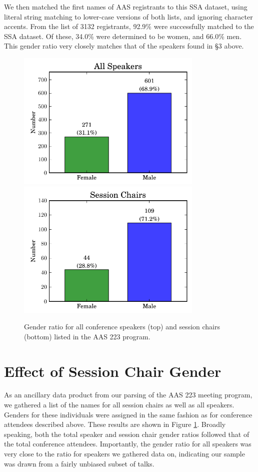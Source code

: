 \documentclass[iop]{emulateapj}
\begin{document}
We then matched the first names of AAS registrants to this SSA dataset, using literal string matching to lower-case versions of both lists, and ignoring character accents. From the list of 3132 registrants, 92.9\% were successfully matched to the SSA dataset. Of these,  34.0\% were determined to be women, and 66.0\% men. This gender ratio very closely matches that of the speakers found in \S3 above.



\begin{figure}[!t]
\centering
\includegraphics[width=3.5in]{speakers}
\includegraphics[width=3.5in]{chairs}
\caption{Gender ratio for all conference speakers (top) and session chairs (bottom) listed in the AAS 223 program.}
\label{fig:speakerchair}
\end{figure}

\section{Effect of Session Chair Gender}

As an ancillary data product from our parsing of the AAS 223 meeting program, we gathered a list of the names for all session chairs as well as all speakers. Genders for these individuals were assigned in the same fashion as for conference attendees described above. These results are shown in Figure \ref{fig:speakerchair}. Broadly speaking, both the total speaker and session chair gender ratios followed that of the total conference attendees. Importantly, the gender ratio for all speakers was very close to the ratio for speakers we gathered data on, indicating our sample was drawn from a fairly unbiased subset of talks.
\end{document}
